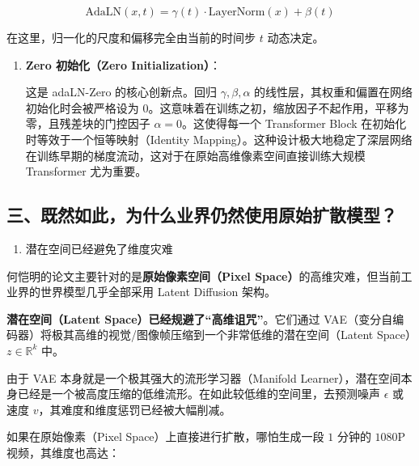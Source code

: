 \[
\mathrm{AdaLN}(x,t)=\gamma(t)\cdot\mathrm{LayerNorm}(x)+\beta(t)
\]

在这里，归一化的尺度和偏移完全由当前的时间步 \(t\) 动态决定。

\begin{enumerate}
\def\labelenumi{\arabic{enumi}.}
\setcounter{enumi}{3}
\item
{}
  \textbf{Zero 初始化（Zero Initialization）}：

  这是 adaLN-Zero 的核心创新点。回归 \(\gamma,\beta,\alpha\) 的线性层，其权重和偏置在网络初始化时会被严格设为 \(0\)。这意味着在训练之初，缩放因子不起作用，平移为零，且残差块的门控因子 \(\alpha=0\)。这使得每一个 Transformer Block 在初始化时等效于一个恒等映射（Identity Mapping）。这种设计极大地稳定了深层网络在训练早期的梯度流动，这对于在原始高维像素空间直接训练大规模 Transformer 尤为重要。
\end{enumerate}

\hypertarget{ux4e09ux65e2ux7136ux5982ux6b64ux4e3aux4ec0ux4e48ux4e1aux754cux4ecdux7136ux4f7fux7528ux539fux59cbux6269ux6563ux6a21ux578b}{%
\subsection{三、既然如此，为什么业界仍然使用原始扩散模型？}\label{ux4e09ux65e2ux7136ux5982ux6b64ux4e3aux4ec0ux4e48ux4e1aux754cux4ecdux7136ux4f7fux7528ux539fux59cbux6269ux6563ux6a21ux578b}}

\begin{enumerate}
\def\labelenumi{\arabic{enumi}.}
\tightlist
\item
  潜在空间已经避免了维度灾难
\end{enumerate}

何恺明的论文主要针对的是\textbf{原始像素空间（Pixel Space）}的高维灾难，但当前工业界的世界模型几乎全部采用 Latent Diffusion 架构。

\textbf{潜在空间（Latent Space）已经规避了``高维诅咒''}。它们通过 VAE（变分自编码器）将极其高维的视觉/图像帧压缩到一个非常低维的潜在空间（Latent Space）\(z\in\mathbb{R}^k\) 中。

由于 VAE 本身就是一个极其强大的流形学习器（Manifold Learner），潜在空间本身已经是一个被高度压缩的低维流形。在如此较低维的空间里，去预测噪声 \(\epsilon\) 或速度 \(v\)，其难度和维度惩罚已经被大幅削减。

如果在原始像素（Pixel Space）上直接进行扩散，哪怕生成一段 \(1\) 分钟的 \(1080\)P 视频，其维度也高达：


